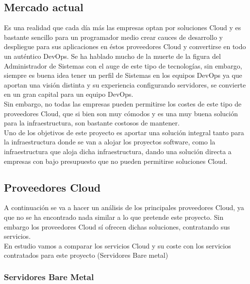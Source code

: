 	\subsection{Mercado actual}
		\begin{text}
			Es una realidad que cada día más las empresas optan por soluciones Cloud y es bastante sencillo para un programador medio crear cauces de desarrollo y despliegue para sus aplicaciones en éstos proveedores Cloud y convertirse en todo un auténtico DevOps. Se ha hablado mucho de la muerte de la figura del Administrador de Sistemas con el auge de este tipo de tecnologías, sin embargo, siempre es buena idea tener un perfil de Sistemas en los equipos DevOps ya que aportan una visión distinta y su experiencia configurando servidores, se convierte en un gran capital para un equipo DevOps. \\ 
			Sin embargo, no todas las empresas pueden permitirse los costes de este tipo de proveedores Cloud, que si bien son muy cómodos y es una muy buena solución para la infraestructura, son bastante costosos de mantener. \\
			Uno de los objetivos de este proyecto es aportar una solución integral tanto para la infraestructura donde se van a alojar los proyectos software, como la infraestructura que aloja dicha infraestructura, dando una solución directa a empresas con bajo presupuesto que no pueden permitirse soluciones Cloud. \\
		\end{text}
	
	\subsection{Proveedores Cloud}
		\begin{text}
			A continuación se va a hacer un análisis de los principales proveedores Cloud, ya que no se ha encontrado nada similar a lo que pretende este proyecto. Sin embargo los proveedores Cloud sí ofrecen dichas soluciones, contratando sus servicios. \\
			En estudio vamos a comparar los servicios Cloud y su coste con los servicios contratados para este proyecto (Servidores Bare metal) \\
		\end{text}
	
		\subsubsection{Servidores Bare Metal}
			\label{servidores_bare_metal}

